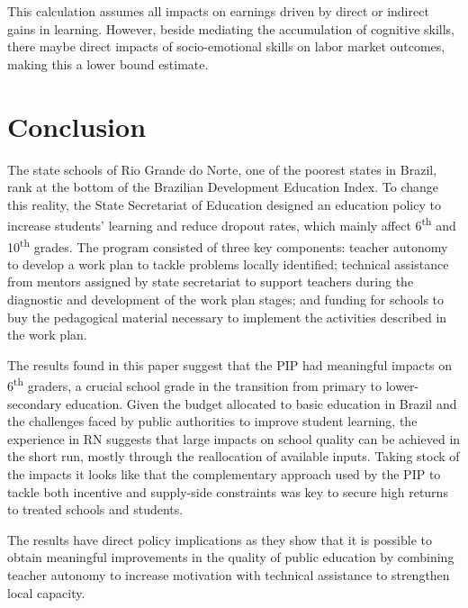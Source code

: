 \documentclass[11pt,a4paper]{article}
\begin{document}
This calculation assumes all impacts on earnings driven by direct or indirect gains in learning. However, beside mediating the accumulation of cognitive skills, there maybe direct impacts of socio-emotional skills on labor market outcomes, making this a lower bound estimate. 


\section{Conclusion} \label{sec:conclude}

The state schools of Rio Grande do Norte, one of the poorest states in Brazil, rank at the bottom of the Brazilian Development Education Index. To change this reality, the State Secretariat of Education designed an education policy to increase students' learning and reduce dropout rates, which mainly affect 6\textsuperscript{th} and 10\textsuperscript{th} grades. The program consisted of three key components: teacher autonomy to develop a work plan to tackle problems locally identified; technical assistance from mentors assigned by state secretariat to support teachers during the diagnostic and development of the work plan stages; and funding for schools to buy the pedagogical material necessary to implement the activities described in the work plan. 

The results found in this paper suggest that the PIP had meaningful impacts on 6\textsuperscript{th} graders, a crucial school grade in the transition from primary to lower-secondary education. Given the budget allocated to basic education in Brazil and the challenges faced by public authorities to improve student learning, the experience in RN suggests that large impacts on school quality can be achieved in the short run, mostly through the reallocation of available inputs. Taking stock of the impacts it looks like that the complementary approach used by the PIP to tackle both incentive and supply-side constraints was key to secure high returns to treated schools and students. 

The results have direct policy implications as they show that it is possible to obtain meaningful improvements in the quality of public education by combining teacher autonomy to increase motivation with technical assistance to strengthen local capacity. 

\end{document}
